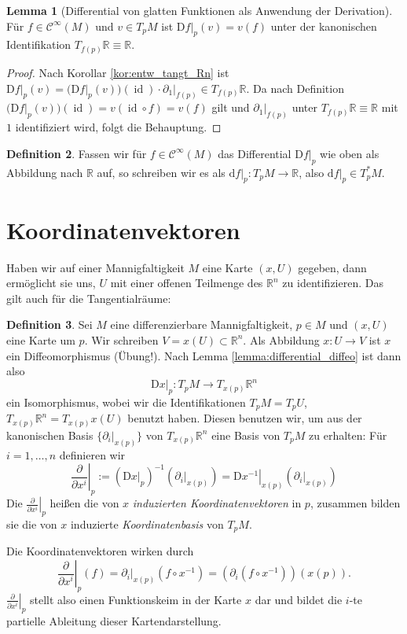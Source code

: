 \documentclass[a4paper]{scrreprt}
\numberwithin{equation}{chapter}
\newcommand{\D}{\mathrm{d}}
\newcommand{\DD}{\mathrm{D}}
\DeclareMathOperator{\id}{id}
\newcommand{\sC}{\mathcal{C}^{\infty}}
\theoremstyle{definition}
\newtheorem{defn}{Definition}[section]
\newtheorem{lemma}[defn]{Lemma}
\begin{document}
\begin{lemma}[Differential von glatten Funktionen als Anwendung der Derivation]
	Für $f\in\sC(M)$ und $v \in T_pM$ ist $\left.\DD f\right|_p(v) = v(f)$ unter der kanonischen Identifikation $T_{f(p)}\mathbb R \equiv \mathbb R$.

	\begin{proof}
		Nach Korollar \ref{kor:entw_tangt_Rn} ist $\left.\DD f\right|_p(v) = \Big(\DD f\big|_p(v)\Big)(\id) \cdot \left.\partial_1\right|_{f(p)} \in T_{f(p)}\mathbb R$. Da nach Definition $\Big(\DD f\big|_p(v)\Big)(\id) = v(\id \circ f) = v(f)$ gilt und $\left.\partial_1\right|_{f(p)}$ unter $T_{f(p)}\mathbb R \equiv \mathbb R$ mit $1$ identifiziert wird, folgt die Behauptung.
	\end{proof}
\end{lemma}

\begin{defn}
	Fassen wir für $f \in \sC(M)$ das Differential $\left.\DD f\right|_p$ wie oben als Abbildung nach $\mathbb R$ auf, so schreiben wir es als $\left.\D f\right|_p \colon T_pM \to \mathbb R$, also $\left.\D f\right|_p \in T_p^*M$.
\end{defn}

\section{Koordinatenvektoren}

Haben wir auf einer Mannigfaltigkeit $M$ eine Karte $(x,U)$ gegeben, dann ermöglicht sie uns, $U$ mit einer offenen Teilmenge des $\mathbb R^n$ zu identifizieren. Das gilt auch für die Tangentialräume:
\begin{defn}
	Sei $M$ eine differenzierbare Mannigfaltigkeit, $p\in M$ und $(x,U)$ eine Karte um $p$. Wir schreiben $V = x(U) \subset \mathbb R^n$. Als Abbildung $x\colon U \to V$ ist $x$ ein Diffeomorphismus (Übung!). Nach Lemma \ref{lemma:differential_diffeo} ist dann also
	\[\left.\DD x\right|_p \colon T_pM \to T_{x(p)} \mathbb R^n\]
	ein Isomorphismus, wobei wir die Identifikationen $T_pM = T_pU$, $T_{x(p)}\mathbb R^n = T_{x(p)} x(U)$ benutzt haben. Diesen benutzen wir, um aus der kanonischen Basis $\{\left.\partial_i\right|_{x(p)}\}$ von $T_{x(p)}\mathbb R^n$ eine Basis von $T_pM$ zu erhalten: Für $i = 1,\dots, n$ definieren wir
	\[\left.\frac{\partial}{\partial x^i}\right|_p := \left(\left.\DD x\right|_p\right)^{-1} \left(\left.\partial_i\right|_{x(p)}\right) = \left.\DD x^{-1}\right|_{x(p)} \left(\left.\partial_i\right|_{x(p)}\right)\]
	Die $\left.\frac{\partial}{\partial x^i}\right|_p$ heißen die von $x$ \emph{induzierten Koordinatenvektoren} in $p$, zusammen bilden sie die von $x$ induzierte \emph{Koordinatenbasis} von $T_pM$.
\end{defn}
Die Koordinatenvektoren wirken durch
\[\left.\frac{\partial}{\partial x^i}\right|_p(f) = \left.\partial_i\right|_{x(p)} (f \circ x^{-1}) = \left(\partial_i (f\circ x^{-1})\right) (x(p)).\]
$\left.\frac{\partial}{\partial x^i}\right|_p$ stellt also einen Funktionskeim in der Karte $x$ dar und bildet die $i$-te partielle Ableitung dieser Kartendarstellung.
\end{document}
